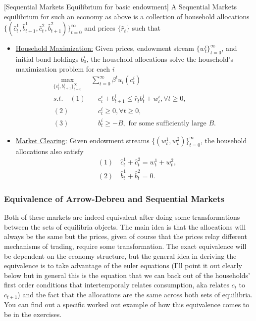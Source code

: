 \documentclass[11pt,english]{article}
\begin{document}
\begin{definition}{[Sequential Markets Equilibrium for basic endowment]} A Sequential Markets equilibrium for such an economy as above is a collection of household allocations $\{( \hat{c}_t^1, \hat{b}_{t+1}^1,\hat{c}_t^2, \hat{b}_{t+1}^2)\}_{t=0}^\infty$ and prices $\{\hat{r}_t\}$ such that 
\begin{itemize}
\item \underline{Household Maximization:} Given prices, endowment stream $\{w_t^i\}_{t = 0}^\infty$, and initial bond holdings $b_0^i$, the household allocations solve the household's maximization problem for each $i$ \begin{align*}
\max_{\{c_t^i, b_{t+1}^i\}_{t=0}^\infty} &\sum_{t=0}^\infty \beta^t u_i(c_t^i)\\
s.t.\quad  (1)& \quad c_t^i + b_{t+1}^i \leq \hat{r}_tb_t^i + w_t^i,\forall t\geq 0,\\
(2)&\quad c_t^i \geq 0, \forall t\geq 0,\\
(3)&\quad b_t^i \geq -B,\text{ for some sufficiently large } B.
\end{align*}
\item \underline{Market Clearing:} Given endowment streams $\{(w_t^1, w_t^2)\}_{t = 0}^\infty$, the household allocations also satisfy \begin{align*}
&(1)\quad \hat{c}_t^1 + \hat{c}_t^2 = w_t^1 + w_t^2,\\
&(2)\quad \hat{b}_t^1 + \hat{b}_t^2 = 0.
\end{align*}
\end{itemize}
\end{definition}

\subsubsection{Equivalence of Arrow-Debreu and Sequential Markets}
Both of these markets are indeed equivalent after doing some transformations between the sets of equilibria objects. The main idea is that the allocations will always be the same but the prices, given of course that the prices relay different mechanisms of trading, require some transformation. The exact equivalence will be dependent on the economy structure, but the general idea in deriving the equivalence is to take advantage of the euler equations (I'll point it out clearly below but in general this is the equation that we can back out of the households' first order conditions that intertemporaly relates consumption, aka relates $c_t$ to $c_{t+1}$) and the fact that the allocations are the same across both sets of equilibria. You can find out a specific worked out example of how this equivalence comes to be in the exercises.
\end{document}
